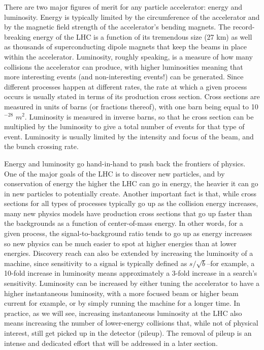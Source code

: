 There are two major figures of merit for any particle accelerator: energy and luminosity.  Energy is typically limited by the circumference of the accelerator and by the magnetic field strength of the accelerator's bending magnets.  The record-breaking energy of the LHC is a function of its tremendous size (27 km) as well as thousands of superconducting dipole magnets that keep the beams in place within the accelerator.  Luminosity, roughly speaking, is a measure of how many collisions the accelerator can produce, with higher luminosities meaning that more interesting events (and non-interesting events!) can be generated.  Since different processes happen at different rates, the rate at which a given process occurs is usually stated in terms of its production cross section.  Cross sections are measured in units of barns (or fractions thereof), with one barn being equal to 10$^{-28}$ $m^2$.  Luminosity is measured in inverse barns, so that he cross section can be multiplied by the luminosity to give a total number of events for that type of event.  Luminosity is usually limited by the intensity and focus of the beam, and the bunch crossing rate.

Energy and luminosity go hand-in-hand to push back the frontiers of physics.  One of the major goals of the LHC is to discover new particles, and by conservation of energy the higher the LHC can go in energy, the heavier it can go in new particles to potentially create.  Another important fact is that, while cross sections for all types of processes typically go up as the collision energy increases, many new physics models have production cross sections that go up faster than the backgrounds as a function of center-of-mass energy.  In other words, for a given process, the signal-to-background ratio tends to go up as energy increases so new physics can be much easier to spot at higher energies than at lower energies.  Discovery reach can also be extended by increasing the luminosity of a machine, since sensitivity to a signal is typically defined as $s/\sqrt{b}$--for example, a 10-fold increase in luminosity means approximately a 3-fold increase in a search's sensitivity.  Luminosity can be increased by either tuning the accelerator to have a higher instantaneous luminosity, with a more focused beam or higher beam current for example, or by simply running the machine for a longer time.  In practice, as we will see, increasing instantaneous luminosity at the LHC also means increasing the number of lower-energy collisions that, while not of physical interest, still get picked up in the detector (pileup).  The removal of pileup is an intense and dedicated effort that will be addressed in a later section.


